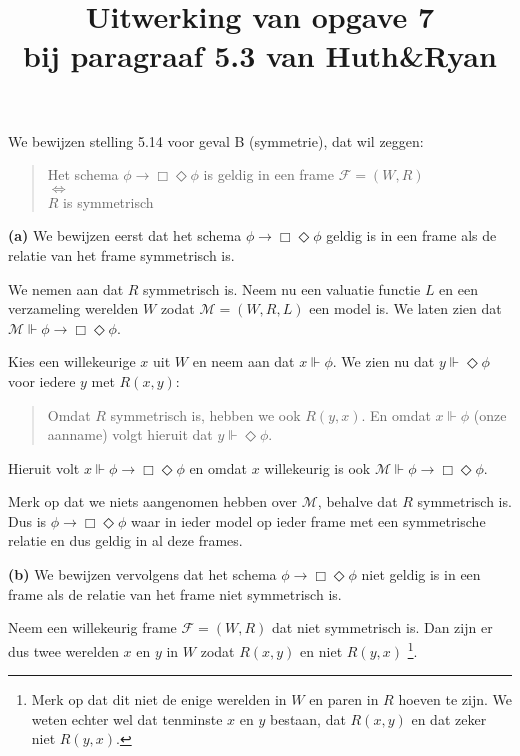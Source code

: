 \documentclass[a4paper,11pt]{article}
\title{Uitwerking van opgave 7\\
\normalsize{bij paragraaf 5.3 van Huth\&Ryan}}
\date{}
\begin{document}
\maketitle


We bewijzen stelling 5.14 voor geval B (symmetrie), dat wil zeggen:

\begin{quote}
  Het schema $\phi \rightarrow \Box \Diamond \phi$ is geldig in een frame
  $\mathcal{F} = (W, R)$ \\
  $\Longleftrightarrow$ \\
  $R$ is symmetrisch
\end{quote}


\begin{description}

\item{\bf (a)}
We bewijzen eerst dat het schema $\phi \rightarrow \Box \Diamond \phi$ geldig
is in een frame als de relatie van het frame symmetrisch is.

We nemen aan dat $R$ symmetrisch is. Neem nu een valuatie functie $L$ en een
verzameling werelden $W$ zodat $\mathcal{M} = (W, R, L)$ een model is. We
laten zien dat $\mathcal{M} \Vdash \phi \rightarrow \Box \Diamond \phi$.

Kies een willekeurige $x$ uit $W$ en neem aan dat $x \Vdash \phi$. We zien nu
dat $y \Vdash \Diamond \phi$ voor iedere $y$ met $R(x, y)$:
\begin{quote}
  Omdat $R$ symmetrisch is, hebben we ook $R(y, x)$. En omdat $x \Vdash \phi$
  (onze aanname) volgt hieruit dat $y \Vdash \Diamond \phi$.
\end{quote}
Hieruit volt $x \Vdash \phi \rightarrow \Box \Diamond \phi$ en omdat $x$
willekeurig is ook $\mathcal{M} \Vdash \phi \rightarrow \Box \Diamond \phi$.

Merk op dat we niets aangenomen hebben over $\mathcal{M}$, behalve dat $R$
symmetrisch is. Dus is $\phi \rightarrow \Box \Diamond \phi$ waar in ieder
model op ieder frame met een symmetrische relatie en dus geldig in al deze
frames.

\item{\bf (b)}
We bewijzen vervolgens dat het schema $\phi \rightarrow \Box \Diamond \phi$
niet geldig is in een frame als de relatie van het frame niet symmetrisch is.

Neem een willekeurig frame $\mathcal{F} = (W, R)$ dat niet symmetrisch is. Dan
zijn er dus twee werelden $x$ en $y$ in $W$ zodat $R(x, y)$ en niet $R(y, x)$
\footnote{Merk op dat dit niet de enige werelden in $W$ en paren in $R$ hoeven
te zijn. We weten echter wel dat tenminste $x$ en $y$ bestaan, dat $R(x, y)$
en dat zeker niet $R(y, x)$.}.


\end{description}
\end{document}
